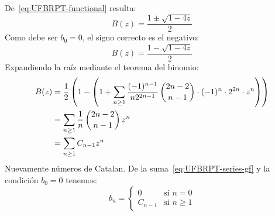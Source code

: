   De~\eqref{eq:UFBRPT-functional} resulta:
  \begin{equation*}
    B(z)
      = \frac{1 \pm \sqrt{1 - 4 z}}{2}
  \end{equation*}
  Como debe ser \(b_0 = 0\),
  el signo correcto es el negativo:%
  \begin{equation}
    \label{eq:eq:UFBRPT-gf}
    B(z)
      = \frac{1 - \sqrt{1 - 4 z}}{2}
  \end{equation}
  Expandiendo la raíz mediante el teorema del binomio:
  \begin{align}
    B(z)
      &= \frac{1}{2}
	   \left(
	     1 - \left(
		   1 + \sum_{n \ge 1}
			 \frac{(-1)^{n - 1}}{n 2^{2 n - 1}} \,
			   \binom{2 n - 2}{n - 1}
			     \cdot (-1)^n \cdot 2^{2 n} \cdot z^n
		 \right)
	   \right) \notag \\
      &= \sum_{n \ge 1}
	   \frac{1}{n} \, \binom{2 n - 2}{n - 1} \, z^n \notag \\
      &= \sum_{n \ge 1} C_{n - 1} z^n
	   \label{eq:UFBRPT-series-gf}
  \end{align}
  Nuevamente números de Catalan.%
  De la suma~\eqref{eq:UFBRPT-series-gf}
  y la condición \(b_0 = 0\) tenemos:
  \begin{equation}
    \label{eq:UFBRPT-number}
    b_n
      = \begin{cases}
	  0	    & \text{si \(n = 0\)} \\
	  C_{n - 1} & \text{si \(n \ge 1\)}
	\end{cases}
  \end{equation}

